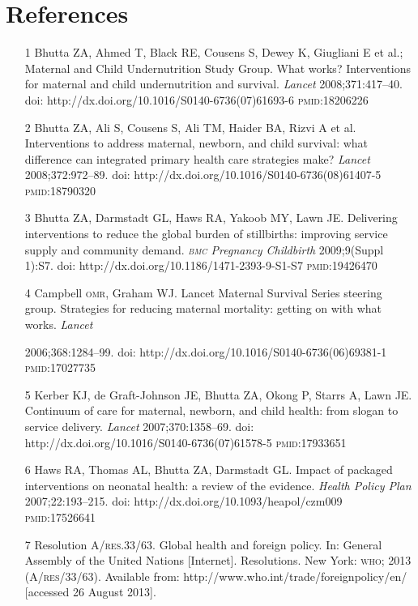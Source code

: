 \documentclass{article}
\begin{document}
\section*{References}
\begin{itemize}

\item[1] Bhutta ZA, Ahmed T, Black RE, Cousens S, Dewey K, Giugliani E et al.;
Maternal and
Child Undernutrition Study Group. What works? Interventions for maternal and
child undernutrition
and survival. \textit{Lancet}
2008;371:417–40. doi:
http://dx.doi.org/10.1016/S0140-6736(07)61693-6 \textsc{pmid}:18206226

\item[2] Bhutta ZA, Ali S, Cousens S, Ali TM, Haider BA, Rizvi A et al.
Interventions to
address maternal, newborn, and child survival: what difference can integrated
primary health care
strategies make? \textit{Lancet}
2008;372:972–89. doi:
http://dx.doi.org/10.1016/S0140-6736(08)61407-5 \textsc{pmid}:18790320

\item[3] Bhutta ZA, Darmstadt GL, Haws RA, Yakoob MY, Lawn JE. Delivering
interventions to
reduce the global burden of stillbirths: improving service supply and community
demand. \textit{\textsc{bmc}
Pregnancy Childbirth}
2009;9(Suppl 1):S7. doi: http://dx.doi.org/10.1186/1471-2393-9-S1-S7
\textsc{pmid}:19426470

\item[4] Campbell \textsc{omr}, Graham WJ. Lancet Maternal Survival Series steering
group. Strategies
for reducing maternal mortality: getting on with what works. \textit{Lancet}

2006;368:1284–99. doi: http://dx.doi.org/10.1016/S0140-6736(06)69381-1
\textsc{pmid}:17027735

\item[5] Kerber KJ, de Graft-Johnson JE, Bhutta ZA, Okong P, Starrs A, Lawn JE.
Continuum of
care for maternal, newborn, and child health: from slogan to service delivery.
\textit{Lancet}
2007;370:1358–69. doi: http://dx.doi.org/10.1016/S0140-6736(07)61578-5
\textsc{pmid}:17933651

\item[6] Haws RA, Thomas AL, Bhutta ZA, Darmstadt GL. Impact of packaged
interventions on
neonatal health: a review of the evidence. \textit{Health Policy Plan}
2007;22:193–215. doi:
http://dx.doi.org/10.1093/heapol/czm009 \textsc{pmid}:17526641

\item[7] Resolution A/\textsc{res}.33/63. Global health and foreign policy. In: General
Assembly of
the United Nations [Internet]. Resolutions. New York: \textsc{who}; 2013 (A/\textsc{res}/33/63).
Available from:
http://www.who.int/trade/foreignpolicy/en/ [accessed 26 August 2013].


\end{itemize}
\end{document}
